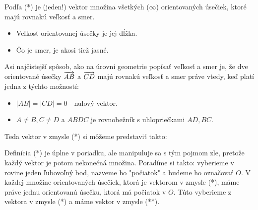 Podľa (*) je (jeden!) vektor množina všetkých ($\infty$) orientovaných úsečiek, ktoré majú rovnakú veľkosť a smer.

\begin{itemize}
    \item Veľkosť orientovanej úsečky je jej dĺžka.
    \item Čo je smer, je akosi tiež jasné.
\end{itemize}

Asi najčistejší spôsob, ako na úrovni geometrie popísať veľkosť a smer je, že dve orientované úsečky $\overrightarrow{AB}$ a $\overrightarrow{CD}$ majú rovnakú veľkosť a smer práve vtedy, keď platí jedna z týchto možností:
\begin{itemize}
    \item $|AB|=|CD|=0$ - nulový vektor.
    \item $A \neq B, C \neq D$ a $ABDC$ je rovnobežník s uhlopriečkami $AD, BC$.
\end{itemize}

\begin{center}
\end{center}

Teda vektor v zmysle (*) si môžeme predstaviť takto:
\begin{center}
\end{center}

Definícia (*) je úplne v poriadku, ale manipuluje sa s tým pojmom zle, pretože každý vektor je potom nekonečná množina.
Poradíme si takto: vyberieme v rovine jeden ľubovoľný bod, nazveme ho "počiatok" a budeme ho označovať $O$. V každej množine orientovaných úsečiek, ktorá je vektorom v zmysle (*), máme práve jednu orientovanú úsečku, ktorá má počiatok v $O$. Túto vyberieme z vektora v zmysle (*) a máme vektor v zmysle (**).

